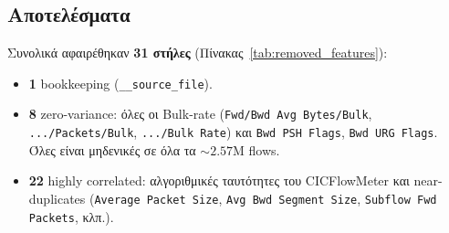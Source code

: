 \documentclass[12pt,a4paper,twoside]{book}
\begin{document}
\subsection{Αποτελέσματα}

Συνολικά αφαιρέθηκαν \textbf{31 στήλες} (Πίνακας~\ref{tab:removed_features}):

\begin{itemize}
    \item \textbf{1} bookkeeping (\texttt{\_\_source\_file}).
    \item \textbf{8} zero-variance: όλες οι Bulk-rate (\texttt{Fwd/Bwd Avg
    Bytes/Bulk}, \texttt{.../Packets/Bulk}, \texttt{.../Bulk Rate}) και
    \texttt{Bwd PSH Flags}, \texttt{Bwd URG Flags}. Όλες είναι μηδενικές
    σε όλα τα \(\sim 2.57\)M flows.
    \item \textbf{22} highly correlated: αλγοριθμικές ταυτότητες του
    CICFlowMeter και near-duplicates (\texttt{Average Packet Size},
    \texttt{Avg Bwd Segment Size}, \texttt{Subflow Fwd Packets},
    κλπ.).
\end{itemize}
\end{document}
